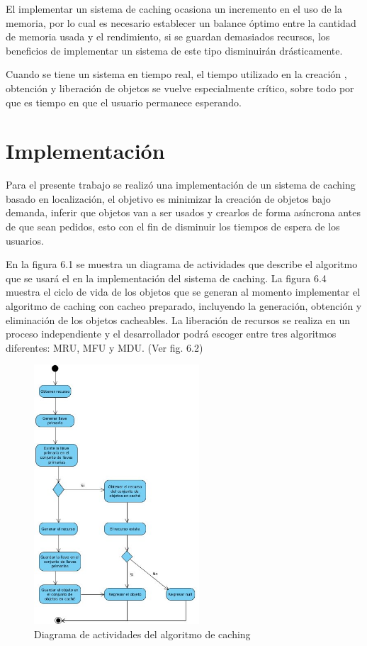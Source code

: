 \documentclass[12pt,a4paper,spanish,openany]{book}
\begin{document}
El implementar un sistema de caching ocasiona un incremento en el uso de la
memoria, por lo cual es necesario establecer un balance óptimo
entre la cantidad de memoria usada y el rendimiento, si se guardan demasiados
recursos, los beneficios de implementar un sistema de este tipo disminuirán
drásticamente.


Cuando se tiene un sistema en tiempo real, el tiempo utilizado en la creación ,
obtención y liberación de objetos se vuelve especialmente crítico, sobre todo
por que es tiempo en que el usuario permanece esperando.


\section{Implementación}



Para el presente trabajo se realizó una implementación de un sistema de
caching basado en localización, el objetivo es minimizar la creación de objetos
bajo demanda, inferir que objetos van a ser usados y crearlos de forma asíncrona
antes de que sean pedidos, esto con el fin de disminuir los tiempos de espera de
los usuarios. 


En la figura 6.1 se
muestra un diagrama de actividades que describe el algoritmo que se usará el en
la implementación del sistema de caching. La figura 6.4 muestra el ciclo de
vida de los objetos que se generan al momento implementar el algoritmo de
caching con cacheo preparado, incluyendo la generación, obtención y eliminación
de los objetos cacheables.  La liberación de recursos se realiza en un proceso
independiente y el desarrollador podrá escoger entre tres algoritmos diferentes:
MRU, MFU y MDU. (Ver fig. 6.2)

\begin{figure}
\begin{center}
 \includegraphics[width=0.55\textwidth]{./img/caching4.jpg}
\caption{Diagrama de actividades del algoritmo de caching}
\end{center}
\end{figure}
\end{document}
